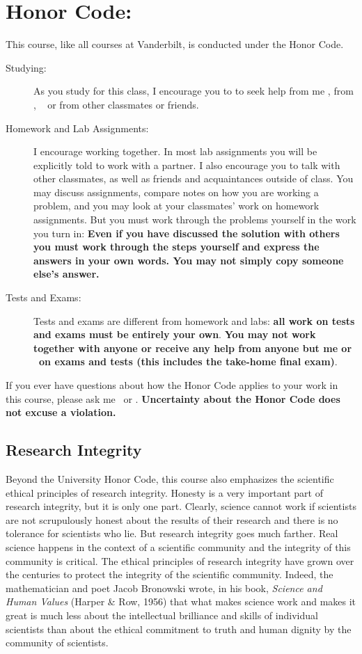 \documentclass[11pt,twoside]{jgsyllabus}\usepackage[]{graphicx}\usepackage[]{color}
\begin{document}
\section{Honor Code:}
This course, like all courses at Vanderbilt, is conducted under the Honor Code.
\begin{description}
  \item[Studying:] As you study for this class,
    I encourage you to to seek help from me%
    \ifTA
      , from \TaTitle,
    \else
      \
    \fi
    or from other classmates or friends.
%
  \item[Homework and Lab Assignments:] I encourage working together.
    In most lab assignments you will be explicitly told to work with a partner.
    I also encourage you to talk with other classmates, as well as friends and
    acquaintances outside of class. You may discuss assignments, compare notes
    on how you are working a problem, and you may look at your
    classmates' work on %
    homework assignments.
    But you must work through the problems yourself in the work you turn in:
    \textbf{Even if you have discussed the solution with others you must
    work through the steps yourself and express the answers in your own words.
    You may not simply copy someone else's answer.} %
%
  \item[Tests and Exams:] Tests and exams are different from homework and labs:
    \textbf{all work on tests and exams must be entirely your own}.
    \textbf{You may not work together with anyone or receive any help from
    anyone but me%
    \ifTA
    or \TaTitle
    \fi
    \ on exams and tests (this includes the take-home final exam)}.
\end{description}

If you ever
have questions about how the Honor Code applies to your work
in this course, please ask me%
\ifTA
\ or \TaTitle
\fi
.
\textbf{Uncertainty about the Honor Code does not excuse a violation.}

\subsection{Research Integrity}

Beyond the University Honor Code, this course also emphasizes the scientific
ethical principles of research integrity.
Honesty is a very important part of research integrity, but it is only one part.
Clearly, science cannot work if scientists are not scrupulously honest about
the results of their research and there is no tolerance for scientists who
lie. But research integrity goes much farther. Real science happens in the
context of a scientific community and the integrity of this community is
critical. The ethical principles of research
integrity have grown over the centuries to protect the integrity of the
scientific community. Indeed, the mathematician and poet Jacob Bronowski wrote,
in his book, \emph{Science and Human Values\/} (Harper \& Row, 1956) that what
makes science work and makes it great is much less about the intellectual
brilliance and skills of individual scientists than about the ethical commitment
to truth and human dignity by the community of scientists.
\end{document}
